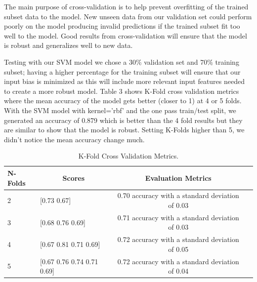 \documentclass[11pt]{article}
\begin{document}
The main purpose of cross-validation is to help prevent overfitting of the trained subset data to the model. New unseen data from our validation set could perform poorly on the model producing invalid predictions if the trained subset fit too well to the model. Good results from cross-validation will ensure that the model is robust and generalizes well to new data. \cite{geekforgeeks2023}

Testing with our SVM model we chose a 30\% validation set and 70\% training subset; having a higher percentage for the training subset will ensure that our input bias is minimized as this will include more relevant input features needed to create a more robust model. Table 3 shows K-Fold cross validation metrics where the mean accuracy of the model gets better (closer to 1) at 4 or 5 folds. With the SVM model with kernel=’rbf’ and the one pass train/test split, we generated an accuracy of 0.879 which is better than the 4 fold results but they are similar to show that the model is robust. Setting K-Folds higher than 5, we didn’t notice the mean accuracy change much.



\begin{table}[hbt!]
   \large
   \centering
   \begin{tabular}{lccr}
   \hline
   \textbf{N-Folds} & \textbf{Scores} & \textbf{Evaluation Metrics} \\ 
   \hline
   2 & \multicolumn{1}{l}{[0.73 0.67]} & 0.70 accuracy with a standard deviation of 0.03 \\
   3 & \multicolumn{1}{l}{[0.68 0.76 0.69]} & 0.71 accuracy with a standard deviation of 0.03 \\
   4 & \multicolumn{1}{l}{[0.67 0.81 0.71 0.69]} & 0.72 accuracy with a standard deviation of 0.05 \\
   5 & \multicolumn{1}{l}{[0.67 0.76 0.74 0.71 0.69]} & 0.72 accuracy with a standard deviation of 0.04 \\
   \hline
   \end{tabular}
   \caption{K-Fold Cross Validation Metrics.} 
\end{table}

\end{document}
